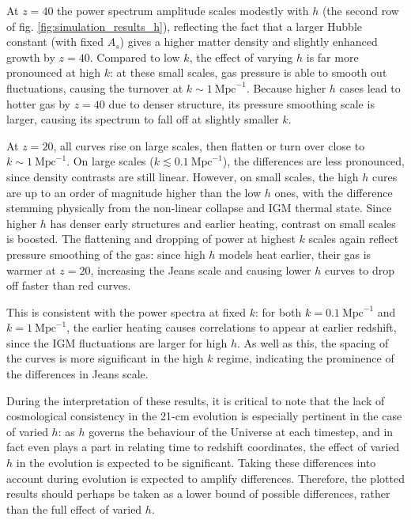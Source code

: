 \documentclass[floats,floatfix,showpacs,amssymb,prd,superscriptaddress,nofootinbib]{revtex4-2} %
\begin{document}
At $z = 40$ the power spectrum amplitude scales modestly with $h$ (the second row of fig. \ref{fig:simulation_results_h}), reflecting the fact that a larger Hubble constant (with fixed $A_s$) gives a higher matter density and slightly enhanced growth by $z = 40$. Compared to low $k$, the effect of varying $h$ is far more pronounced at high $k$: at these small scales, gas pressure is able to smooth out fluctuations, causing the turnover at $k \sim 1 ~\text{Mpc}^{-1}$. Because higher $h$ cases lead to hotter gas by $z = 40$ due to denser structure, its pressure smoothing scale is larger, causing its spectrum to fall off at slightly smaller $k$. 

At $z = 20$, all curves rise on large scales, then flatten or turn over close to $k \sim 1 ~\text{Mpc}^{-1}$. On large scales ($k \lesssim 0.1 ~\text{Mpc}^{-1}$), the differences are less pronounced, since density contrasts are still linear. However, on small scales, the high $h$ cures are up to an order of magnitude higher than the low $h$ ones, with the difference stemming physically from the non-linear collapse and IGM thermal state. Since higher $h$ has denser early structures and earlier heating, contrast on small scales is boosted. The flattening and dropping of power at highest $k$ scales again reflect pressure smoothing of the gas: since high $h$ models heat earlier, their gas is warmer at $z = 20$, increasing the Jeans scale and causing lower $h$ curves to drop off faster than red curves.

This is consistent with the power spectra at fixed $k$: for both $k = 0.1 ~\text{Mpc}^{-1}$ and $k = 1 ~\text{Mpc}^{-1}$, the earlier heating causes correlations to appear at earlier redshift, since the IGM fluctuations are larger for high $h$. As well as this, the spacing of the curves is more significant in the high $k$ regime, indicating the prominence of the differences in Jeans scale.

During the interpretation of these results, it is critical to note that the lack of cosmological consistency in the 21-cm evolution is especially pertinent in the case of varied $h$: as $h$ governs the behaviour of the Universe at each timestep, and in fact even plays a part in relating time to redshift coordinates, the effect of varied $h$ in the evolution is expected to be significant. Taking these differences into account during evolution is expected to amplify differences. Therefore, the plotted results should perhaps be taken as a lower bound of possible differences, rather than the full effect of varied $h$.
\end{document}
